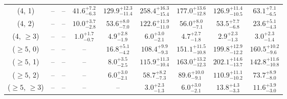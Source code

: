 \begin{table}[h!]
{\begin{tabular}{ccccccccc}
	(4, 1) & -- & -- & $41.6^{+ 7.2 }_{- 6.3 }$ & $129.9^{+ 12.3 }_{- 11.4 }$ & $258.4^{+ 16.3 }_{- 15.4 }$ & $177.0^{+ 13.6 }_{- 12.8 }$ & $126.9^{+ 11.4 }_{- 10.5 }$ & $63.1^{+ 7.1 }_{- 6.5 }$ \\[0.5ex] 
	(4, 2) & -- & -- & $10.0^{+ 3.7 }_{- 2.8 }$ & $53.6^{+ 8.0 }_{- 7.0 }$ & $122.6^{+ 11.9 }_{- 11.0 }$ & $56.0^{+ 8.0 }_{- 7.1 }$ & $53.5^{+ 7.7 }_{- 6.8 }$ & $23.6^{+ 5.1 }_{- 4.3 }$ \\[0.5ex] 
	(4, $\ge3$) & -- & -- & $1.0^{+ 1.7 }_{- 0.7 }$ & $4.9^{+ 2.8 }_{- 1.9 }$ & $6.0^{+ 3.0 }_{- 2.1 }$ & $4.7^{+ 2.7 }_{- 1.8 }$ & $2.9^{+ 2.3 }_{- 1.3 }$ & $3.0^{+ 2.3 }_{- 1.4 }$ \\[0.5ex] 
	($\ge5$, 0) & -- & -- & -- & $16.8^{+ 5.1 }_{- 4.2 }$ & $108.4^{+ 9.9 }_{- 9.3 }$ & $151.1^{+ 11.5 }_{- 10.8 }$ & $199.8^{+ 12.9 }_{- 12.2 }$ & $160.5^{+ 10.2 }_{- 9.6 }$ \\[0.5ex] 
	($\ge5$, 1) & -- & -- & -- & $8.0^{+ 3.5 }_{- 2.5 }$ & $115.9^{+ 11.3 }_{- 10.4 }$ & $163.0^{+ 13.2 }_{- 12.3 }$ & $202.1^{+ 14.6 }_{- 13.7 }$ & $142.8^{+ 11.6 }_{- 10.8 }$ \\[0.5ex] 
	($\ge5$, 2) & -- & -- & -- & $6.0^{+ 3.0 }_{- 2.1 }$ & $58.7^{+ 8.2 }_{- 7.3 }$ & $89.6^{+ 10.0 }_{- 9.1 }$ & $110.9^{+ 11.1 }_{- 10.2 }$ & $73.7^{+ 8.9 }_{- 8.0 }$ \\[0.5ex] 
	($\ge5$, $\ge3$) & -- & -- & -- & -- & $3.0^{+ 2.3 }_{- 1.3 }$ & $6.0^{+ 3.0 }_{- 2.1 }$ & $13.8^{+ 4.3 }_{- 3.3 }$ & $11.6^{+ 3.9 }_{- 3.0 }$ \\[0.5ex] 
	\hline
	\hline
\end{tabular}}
\end{table}
